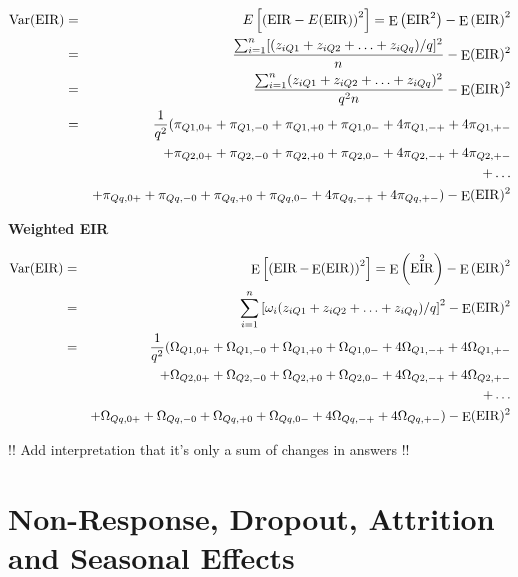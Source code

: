 \documentclass[12pt,a4paper,oneside]{book}
\DeclareMathOperator{\Var}{Var}
\DeclareMathOperator{\E}{E}
\DeclareMathOperator{\EIR}{EIR}
\begin{document}
\begin{eqnarray}
         \Var(\text{EIR}) &=& E \left[ \left(\text{EIR}-E(\text{EIR}) \right)^2 \right] =  \E \left( \text{EIR}^2\right) - \E \left( \text{EIR}\right)^2 \\ 
         &=&  \frac{\sum^n_{i=1}[(z_{iQ1} + z_{iQ2} + \ldots + z_{iQq})/q]^2}{n} - \E (\EIR)^2 \\
        &=&  \frac{\sum^n_{i=1}(z_{iQ1} + z_{iQ2} + \ldots + z_{iQq})^2}{q^2 n} - \E (\EIR)^2 \\
        &=& \frac{1}{q^2} \Large( \pi_{Q1,0+} + \pi_{Q1,-0} + \pi_{Q1,+0} + \pi_{Q1,0-} +4\pi_{Q1,-+} +4\pi_{Q1,+-} \nonumber \\ 
        && + \pi_{Q2,0+} + \pi_{Q2,-0} + \pi_{Q2,+0} + \pi_{Q2,0-} +4\pi_{Q2,-+} +4\pi_{Q2,+-} \nonumber \\ 
        &&  + \ldots \nonumber \\ 
        && + \pi_{Qq,0+} + \pi_{Qq,-0} + \pi_{Qq,+0} + \pi_{Qq,0-} +4\pi_{Qq,-+} +4\pi_{Qq,+-} \Large) - \E (\EIR)^2 \nonumber \\ 
\end{eqnarray}

\textbf{Weighted EIR}

\begin{eqnarray}
         \Var(\text{EIR}) &=& \E \left[ \left( \EIR - \E(\EIR) \right)^2 \right] =  \E \left( \EIR^2\right) - \E \left( \EIR \right)^2 \\ 
         &=&  \sum^n_{i=1} \left[\omega_i (z_{iQ1} + z_{iQ2} + \ldots + z_{iQq})/q \right]^2 - \E (\EIR)^2 \\
        &=& \frac{1}{q^2} \Large( \Omega_{Q1,0+} + \Omega_{Q1,-0} + \Omega_{Q1,+0} + \Omega_{Q1,0-} +4\Omega_{Q1,-+} +4\Omega_{Q1,+-} \nonumber \\ 
        && + \Omega_{Q2,0+} + \Omega_{Q2,-0} + \Omega_{Q2,+0} + \Omega_{Q2,0-} +4\Omega_{Q2,-+} +4\Omega_{Q2,+-} \nonumber \\ 
        &&  + \ldots \nonumber \\ 
        && + \Omega_{Qq,0+} + \Omega_{Qq,-0} + \Omega_{Qq,+0} + \Omega_{Qq,0-} +4\Omega_{Qq,-+} +4\Omega_{Qq,+-} \Large) - \E (\EIR)^2 \nonumber \\ 
\end{eqnarray}

!!
Add interpretation that it's only a sum of changes in answers
!!




\chapter{Non-Response, Dropout, Attrition and Seasonal Effects}
\label{chap:nonresponse dropout}
\end{document}
